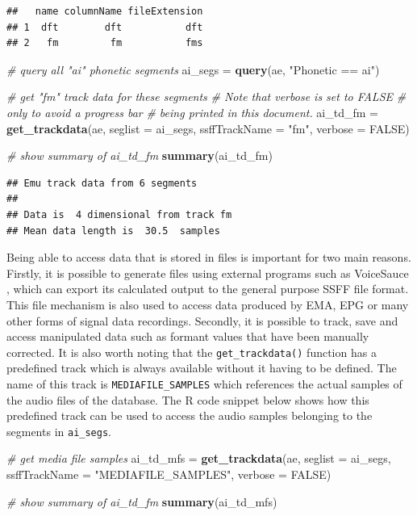 \documentclass[]{book}
\newenvironment{Shaded}{\begin{snugshade}}{\end{snugshade}}
\newcommand{\CommentTok}[1]{\textcolor[rgb]{0.56,0.35,0.01}{\textit{#1}}}
\newcommand{\DataTypeTok}[1]{\textcolor[rgb]{0.13,0.29,0.53}{#1}}
\newcommand{\KeywordTok}[1]{\textcolor[rgb]{0.13,0.29,0.53}{\textbf{#1}}}
\newcommand{\NormalTok}[1]{#1}
\newcommand{\OtherTok}[1]{\textcolor[rgb]{0.56,0.35,0.01}{#1}}
\newcommand{\StringTok}[1]{\textcolor[rgb]{0.31,0.60,0.02}{#1}}
\theoremstyle{definition}
\theoremstyle{definition}
\theoremstyle{definition}
\theoremstyle{remark}
\begin{document}
\begin{verbatim}
##   name columnName fileExtension
## 1  dft        dft           dft
## 2   fm         fm           fms
\end{verbatim}

\begin{Shaded}
\begin{Highlighting}[]
\CommentTok{# query all "ai" phonetic segments}
\NormalTok{ai_segs =}\StringTok{ }\KeywordTok{query}\NormalTok{(ae, }\StringTok{"Phonetic == ai"}\NormalTok{)}

\CommentTok{# get "fm" track data for these segments}
\CommentTok{# Note that verbose is set to FALSE}
\CommentTok{# only to avoid a progress bar}
\CommentTok{# being printed in this document.}
\NormalTok{ai_td_fm =}\StringTok{ }\KeywordTok{get_trackdata}\NormalTok{(ae,}
                      \DataTypeTok{seglist =}\NormalTok{ ai_segs,}
                      \DataTypeTok{ssffTrackName =} \StringTok{"fm"}\NormalTok{,}
                      \DataTypeTok{verbose =} \OtherTok{FALSE}\NormalTok{)}

\CommentTok{# show summary of ai_td_fm}
\KeywordTok{summary}\NormalTok{(ai_td_fm)}
\end{Highlighting}
\end{Shaded}

\begin{verbatim}
## Emu track data from 6 segments
## 
## Data is  4 dimensional from track fm 
## Mean data length is  30.5  samples
\end{verbatim}

Being able to access data that is stored in files is important for two
main reasons. Firstly, it is possible to generate files using external
programs such as VoiceSauce \citep{shue:2011a}, which can export its
calculated output to the general purpose SSFF file format. This file
mechanism is also used to access data produced by EMA, EPG or many other
forms of signal data recordings. Secondly, it is possible to track, save
and access manipulated data such as formant values that have been
manually corrected. It is also worth noting that the
\texttt{get\_trackdata()} function has a predefined track which is
always available without it having to be defined. The name of this track
is \texttt{MEDIAFILE\_SAMPLES} which references the actual samples of
the audio files of the database. The R code snippet below shows how this
predefined track can be used to access the audio samples belonging to
the segments in \texttt{ai\_segs}.

\begin{Shaded}
\begin{Highlighting}[]
\CommentTok{# get media file samples}
\NormalTok{ai_td_mfs =}\StringTok{ }\KeywordTok{get_trackdata}\NormalTok{(ae,}
                          \DataTypeTok{seglist =}\NormalTok{ ai_segs,}
                          \DataTypeTok{ssffTrackName =} \StringTok{"MEDIAFILE_SAMPLES"}\NormalTok{,}
                          \DataTypeTok{verbose =} \OtherTok{FALSE}\NormalTok{)}

\CommentTok{# show summary of ai_td_fm}
\KeywordTok{summary}\NormalTok{(ai_td_mfs)}
\end{Highlighting}
\end{Shaded}
\end{document}
